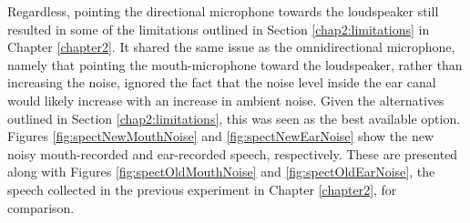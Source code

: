 Regardless, pointing the directional microphone towards the loudspeaker still resulted in some of the limitations outlined in Section \ref{chap2:limitations} in Chapter \ref{chapter2}.  
It shared the same issue as the omnidirectional microphone, namely that pointing the mouth-microphone toward the loudspeaker, rather than increasing the noise, ignored the fact that the noise level inside the ear canal would likely increase \DIFdelbegin {}\DIFdelend with an increase in ambient noise.  Given the alternatives outlined in Section \ref{chap2:limitations}, this was seen as the best available option.  Figures \ref{fig:spectNewMouthNoise} and \ref{fig:spectNewEarNoise} show the new noisy mouth-recorded and ear-recorded speech, respectively.  These are presented along with Figures \ref{fig:spectOldMouthNoise} and \ref{fig:spectOldEarNoise}, the speech collected in the previous experiment in Chapter \ref{chapter2}, for comparison.


